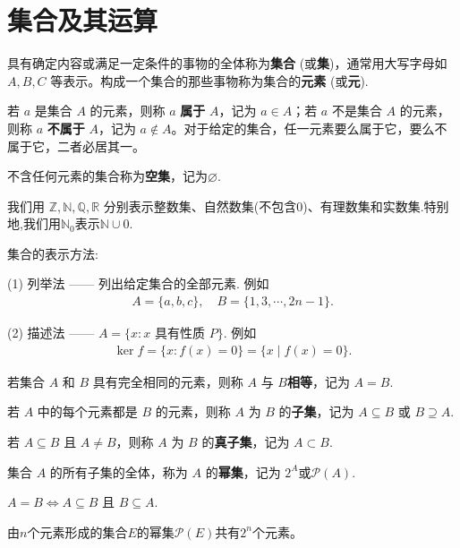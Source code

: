 \documentclass[../../main.tex]{subfiles}%
\begin{document}
\section{集合及其运算}

\begin{definition}[集合]
具有确定内容或满足一定条件的事物的全体称为\textbf{集合} (或\textbf{集})，通常用大写字母如 \(A, B, C\) 等表示。构成一个集合的那些事物称为集合的\textbf{元素} (或\textbf{元}).

若 \(a\) 是集合 \(A\) 的元素，则称 \(a\) \textbf{属于} \(A\)，记为 \(a \in A\)；若 \(a\) 不是集合 \(A\) 的元素，则称 \(a\) \textbf{不属于} \(A\)，记为 \(a \notin A\)。对于给定的集合，任一元素要么属于它，要么不属于它，二者必居其一。

不含任何元素的集合称为\textbf{空集}，记为\(\varnothing\).

我们用 \(\mathbb{Z}, \mathbb{N}, \mathbb{Q}, \mathbb{R}\) 分别表示整数集、自然数集(不包含0)、有理数集和实数集.特别地,我们用$\mathbb{N}_0$表示$\mathbb{N}\cup 0$.
\end{definition}
\begin{remark}
集合的表示方法:

(1) 列举法 —— 列出给定集合的全部元素. 例如
\begin{align*}
A = \{a, b, c\}, \quad B = \{1, 3, \cdots, 2n - 1\}.
\end{align*}

(2) 描述法 —— \(A = \{x : x \text{ 具有性质 } P\}\). 例如
\begin{align*}
\ker f = \{x : f(x) = 0\}=\{x \mid f(x) = 0\}.
\end{align*}
\end{remark}

\begin{definition}
若集合 \(A\) 和 \(B\) 具有完全相同的元素，则称 \(A\) 与 \(B\)\textbf{相等}，记为 \(A = B\).

若 \(A\) 中的每个元素都是 \(B\) 的元素，则称 \(A\) 为 \(B\) 的\textbf{子集}，记为 \(A \subseteq B\) 或 \(B \supseteq A\).

若 \(A \subseteq B\) 且 \(A \neq B\)，则称 \(A\) 为 \(B\) 的\textbf{真子集}，记为 \(A \subset B\).

集合 \(A\) 的所有子集的全体，称为 \(A\) 的\textbf{幂集}，记为 \(2^A\)或\(\mathcal{P}(A)\). 
\end{definition}
\begin{remark}
\(A = B \Longleftrightarrow A \subseteq B\) 且 \(B \subseteq A\).

由\(n\)个元素形成的集合\(E\)的幂集\(\mathcal{P}(E)\)共有\(2^n\)个元素。
\end{remark}
\end{document}
